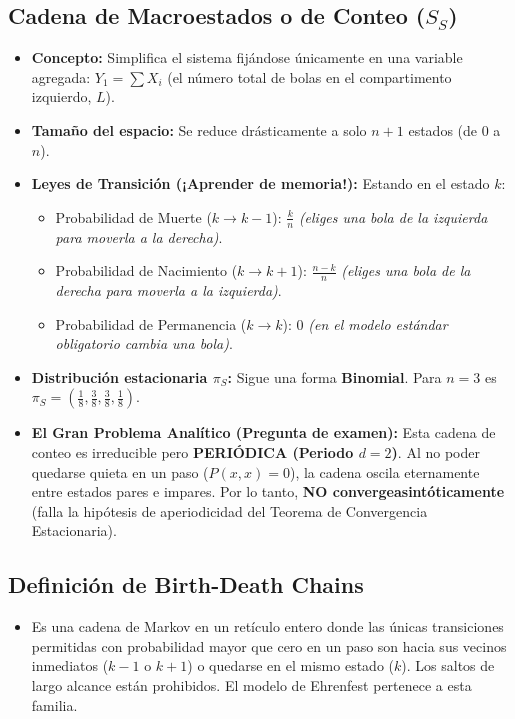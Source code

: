 \documentclass[10pt]{book}
\begin{document}
\subsection{Cadena de Macroestados o de Conteo ($S_S$)}
\begin{itemize}
    \item \textbf{Concepto:} Simplifica el sistema fijándose únicamente en una variable agregada: $Y_1 = \sum X_i$ (el número total de bolas en el compartimento izquierdo, $L$).
    \item \textbf{Tamaño del espacio:} Se reduce drásticamente a solo $n+1$ estados (de $0$ a $n$).
    \item \textbf{Leyes de Transición (¡Aprender de memoria!):} Estando en el estado $k$:
    \begin{itemize}
        \item Probabilidad de Muerte ($k \longrightarrow k-1$): $\frac{k}{n}$ \textit{(eliges una bola de la izquierda para moverla a la derecha)}.
        \item Probabilidad de Nacimiento ($k \longrightarrow k+1$): $\frac{n-k}{n}$ \textit{(eliges una bola de la derecha para moverla a la izquierda)}.
        \item Probabilidad de Permanencia ($k \longrightarrow k$): $0$ \textit{(en el modelo estándar obligatorio cambia una bola)}.
    \end{itemize}
    \item \textbf{Distribución estacionaria $\pi_S$:} Sigue una forma \textbf{Binomial}. Para $n=3$ es $\pi_S = \left(\frac{1}{8}, \frac{3}{8}, \frac{3}{8}, \frac{1}{8}\right)$.
    \item \textbf{El Gran Problema Analítico (Pregunta de examen):} Esta cadena de conteo es irreducible pero \textbf{PERIÓDICA (Periodo $d=2$)}. Al no poder quedarse quieta en un paso ($P(x,x)=0$), la cadena oscila eternamente entre estados pares e impares. Por lo tanto, \textbf{NO convergeasintóticamente} (falla la hipótesis de aperiodicidad del Teorema de Convergencia Estacionaria).
\end{itemize}

\subsection{Definición de Birth-Death Chains}
\begin{itemize}
    \item Es una cadena de Markov en un retículo entero donde las únicas transiciones permitidas con probabilidad mayor que cero en un paso son hacia sus vecinos inmediatos ($k-1$ o $k+1$) o quedarse en el mismo estado ($k$). Los saltos de largo alcance están prohibidos. El modelo de Ehrenfest pertenece a esta familia.
\end{itemize}
\end{document}
